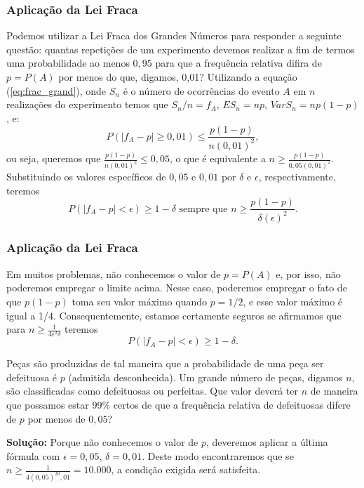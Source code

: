 \begin{frame}
\frametitle{\textbf{Aplicação da Lei Fraca}}
\baselineskip=13pt
\begin{block}{}


Podemos utilizar a Lei Fraca dos Grandes Números para responder a
seguinte questão: quantas repetições de um experimento devemos
realizar a fim de termos uma probabilidade ao menos $0,95$ para que
a frequência relativa difira de $p=P(A)$ por menos do que, digamos,
0,01? Utilizando a equação (\ref{eq:frac_grand}), onde $S_n$ é o
número de ocorrências do evento $A$ em $n$ realizações do
experimento temos que $S_n/n=f_A$, $ES_n=np$, $Var S_n=np(1-p)$, e:
$$P(|f_A-p|\geq 0,01)\leq \frac{p(1-p)}{n(0,01)^2},$$
ou seja, queremos que $\frac{p(1-p)}{n(0,01)^2}\leq 0,05$, o que é
equivalente a $n\geq \frac{p(1-p)}{0,05(0,01)^2}$. Substituindo os
valores específicos de $0,05$ e $0,01$ por $\delta$ e $\epsilon$,
respectivamente, teremos
$$P(|f_A-p|< \epsilon)\geq 1-\delta \mbox{ sempre que } n\geq \frac{p(1-p)}{\delta(\epsilon)^2}.$$

\end{block}
\end{frame}


\begin{frame}
\frametitle{\textbf{Aplicação da Lei Fraca}}
\baselineskip=13pt
\begin{block}{}


Em muitos problemas, não conhecemos o valor de $p=P(A)$ e, por isso,
não poderemos empregar o limite acima. Nesse caso, poderemos
empregar o fato de que $p(1-p)$ toma seu valor máximo quando
$p=1/2$, e esse valor máximo é igual a 1/4. Consequentemente,
estamos certamente seguros se afirmamos que para $n\geq
\frac{1}{4\epsilon^2\delta}$ teremos
$$P(|f_A-p|<\epsilon)\geq 1-\delta.$$

\end{block}
\begin{exem}
	Peças são produzidas de tal maneira que a probabilidade de uma peça
	ser defeituosa é $p$ (admitida desconhecida). Um grande número de
	peças, digamos $n$, são classificadas como defeituosas ou perfeitas.
	Que valor deverá ter $n$ de maneira que possamos estar $99\%$ certos
	de que a frequência relativa de defeituosas difere de $p$ por menos
	de $0,05$?
	
	{\bf Solução:} Porque não conhecemos o valor de $p$, deveremos
	aplicar a última fórmula com $\epsilon=0,05$, $\delta=0,01$. Deste
	modo encontraremos que se $n\geq \frac{1}{4(0,05)^20,01}=10.000$, a
	condição exigida será satisfeita.
\end{exem}

\end{frame}

